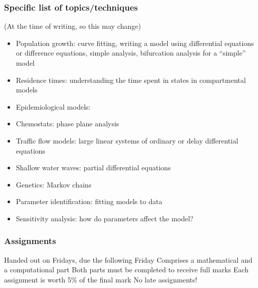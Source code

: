 \documentclass[aspectratio=169]{beamer}
\begin{document}
\begin{frame}\frametitle{Specific list of topics/techniques}
(At the time of writing, so this may change)
\begin{itemize}
\item Population growth: curve fitting, writing a model using differential equations or difference equations, simple analysis, bifurcation analysis for a ``simple'' model
\item Residence times: understanding the time spent in states in compartmental models
\item Epidemiological models: 
\item Chemostats: phase plane analysis
\item Traffic flow models: large linear systems of ordinary or delay differential equations
\item Shallow water waves: partial differential equations
\item Genetics: Markov chains
\item Parameter identification: fitting models to data
\item Sensitivity analysis: how do parameters affect the model?
\end{itemize}
\end{frame}


\begin{frame}\frametitle{Assignments}
Handed out on Fridays, due the following Friday
\vfill
Comprises a mathematical and a computational part
\vfill
Both parts must be completed to receive full marks
\vfill
Each assignment is worth 5\% of the final mark
\vfill
No late assignments!
\end{frame}

\end{document}
